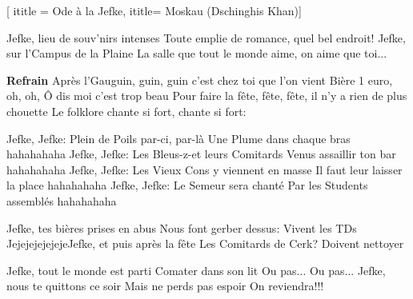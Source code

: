  [
ititle = {Ode à la Jefke},
ititle= Moskau (Dschinghis Khan)]


\beginverse
Jefke, lieu de souv'nirs intenses
Toute emplie de romance, quel bel endroit!
Jefke, sur l'Campus de la Plaine
La salle que tout le monde aime, on aime que toi...
\endverse

\beginchorus
\textbf {Refrain}
Après l'Gauguin, guin, guin c'est chez toi que l'on vient
Bière 1 euro, oh, oh, Ô dis moi c'est trop beau
Pour faire la fête, fête, fête, il n'y a rien de plus chouette
Le folklore chante si fort, chante si fort:
\endchorus

\beginverse
Jefke, Jefke: Plein de Poils par-ci, par-là
Une Plume dans chaque bras hahahahaha
Jefke, Jefke: Les Bleus-z-et leurs Comitards
Venus assaillir ton bar hahahahaha
Jefke, Jefke: Les Vieux Cons y viennent en masse
Il faut leur laisser la place hahahahaha
Jefke, Jefke: Le Semeur sera chanté
Par les Students assemblés hahahahaha
\endverse

\beginverse
Jefke, tes bières prises en abus
Nous font gerber dessus:
Vivent les TDs
JejejejejejejeJefke, et puis après la fête
Les Comitards de Cerk?
Doivent nettoyer
\endverse

\beginverse
Jefke, tout le monde est parti
Comater dans son lit
Ou pas... Ou pas...
Jefke, nous te quittons ce soir
Mais ne perds pas espoir
On reviendra!!!
\endverse

\endsong

